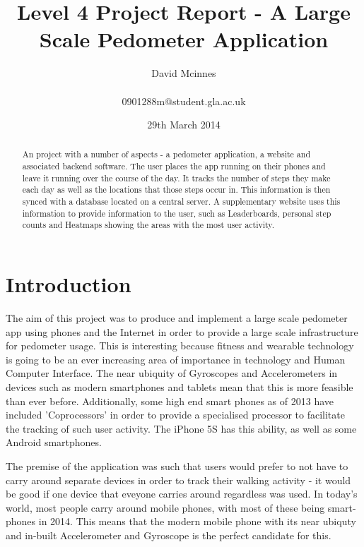 \documentclass{l4proj}
\begin{document}
\title{Level 4 Project Report - A Large Scale Pedometer Application}
\author{David Mcinnes\\ \\0901288m@student.gla.ac.uk}
\date{29th March 2014}
\maketitle

\begin{abstract}

An project with a number of aspects - a pedometer application, a website and associated backend software. The user places the app running on their phones and leave it running over the course of the day. It tracks the number of steps they make each day as well as the locations that those steps occur in. This information is then synced with a database located on a central server. A supplementary website uses this information to provide information to the user, such as Leaderboards, personal step counts and Heatmaps showing the areas with the most user activity.

\end{abstract}

\educationalconsent
\tableofcontents

\chapter{Introduction}

The aim of this project was to produce and implement a large scale pedometer app using phones and the Internet in order to provide a large scale infrastructure for pedometer usage. This is interesting because fitness and wearable technology is going to be an ever increasing area of importance in technology and Human Computer Interface. The near ubiquity of Gyroscopes and Accelerometers in devices such as modern smartphones and tablets mean that this is more feasible than ever before. Additionally, some high end smart phones as of 2013 have included 'Coprocessors' in order to provide a specialised processor to facilitate the tracking of such user activity. The iPhone 5S has this ability, as well as some Android smartphones. 

The premise of the application was such that users would prefer to not have to carry around separate devices in order to track their walking activity - it would be good if one device that eveyone carries around regardless was used. In today's world, most people carry around mobile phones, with most of these being smart-phones in 2014. This means that the modern mobile phone with its near ubiquty and in-built Accelerometer and Gyroscope is the perfect candidate for this.
\end{document}
